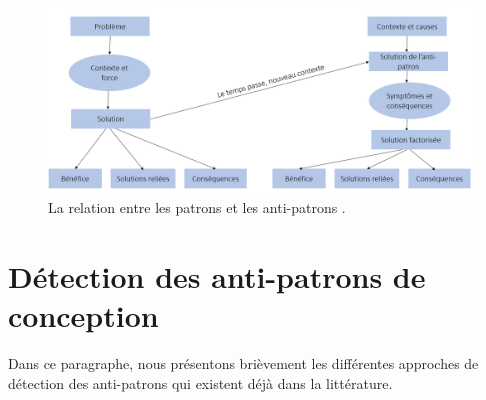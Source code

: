 \begin{figure}[H]

\includegraphics[width=\textwidth]{Others/Resources/patronetantipatron.PNG}
	\caption{La relation entre les patrons et les anti-patrons \cite{brown1998antipatterns}.}
		\label{fig:patanti}
	\end{figure}
	
	\section{Détection  des anti-patrons de conception}
	Dans ce paragraphe, nous présentons brièvement les différentes approches de détection des anti-patrons qui existent déjà dans la littérature.
	
